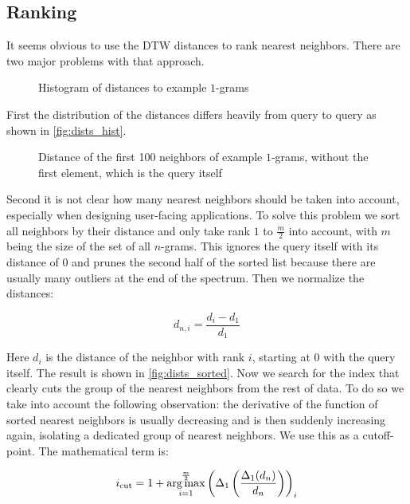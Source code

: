 \subsection{Ranking}
\label{ssec:baseline:sim:rank}

It seems obvious to use the DTW distances to rank nearest neighbors. There are two major problems with that approach.

\begin{figure}
    \centering
    
    \caption{Histogram of distances to example $1$-grams}\label{fig:dists_hist}
\end{figure}

First the distribution of the distances differs heavily from query to query as shown in \autoref{fig:dists_hist}.

\begin{figure}
    \centering
    
    \caption{Distance of the first \num{100} neighbors of example $1$-grams, without the first element, which is the query itself}\label{fig:dists_sorted}
\end{figure}

Second it is not clear how many nearest neighbors should be taken into account, especially when designing user-facing applications. To solve this problem we sort all neighbors by their distance and only take rank $1$ to $\frac{m}{2}$ into account, with $m$ being the size of the set of all $n$-grams. This ignores the query itself with its distance of \num{0} and prunes the second half of the sorted list because there are usually many outliers at the end of the spectrum. Then we normalize the distances:

\begin{equation}\label{eq:dists_norm}
    d_{n,i} = \frac{d_i - d_1}{d_1}
\end{equation}

Here $d_i$ is the distance of the neighbor with rank $i$, starting at \num{0} with the query itself. The result is shown in \autoref{fig:dists_sorted}. Now we search for the index that clearly cuts the group of the nearest neighbors from the rest of data. To do so we take into account the following observation: the derivative of the function of sorted nearest neighbors is usually decreasing and is then suddenly increasing again, isolating a dedicated group of nearest neighbors. We use this as a cutoff-point. The mathematical term is:

\begin{equation}\label{eq:dists_cut}
    i_\text{cut} = 1 + \operatorname*{arg\,max}_{i=1}^\frac{m}{2} \left( \Delta_1 \left( \frac{\Delta_1(d_n)}{d_n} \right) \right)_i
\end{equation}

